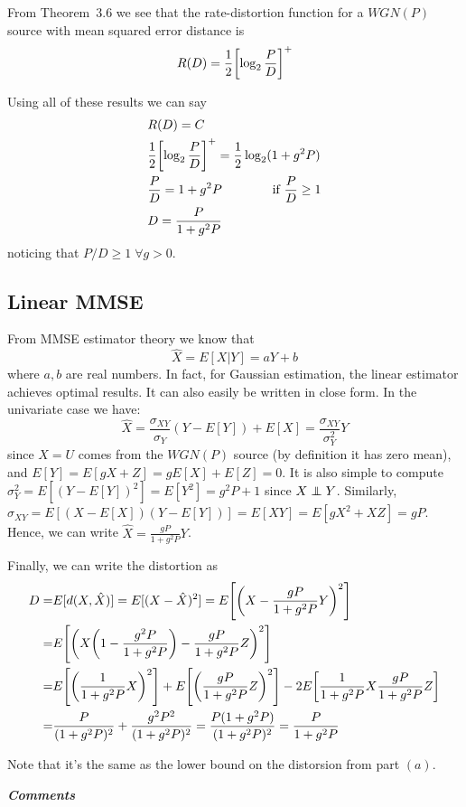 From Theorem~3.6 we see that the rate-distortion function for a $WGN(P)$ source with mean squared error distance is
%
\begin{equation}
R(D) = \frac{1}{2} \qty[\log_2 \frac{P}{D}]^+
\end{equation}

Using all of these results we can say
%
\begin{align}
\begin{split}
&R(D)=C\\
&\frac{1}{2} \qty[\log_2 \frac{P}{D}]^+ = \frac{1}{2} \log_2(1+g^2P) \\
&\frac{P}{D} = 1+g^2P \qquad\qquad \mbox{if } \frac{P}{D} \geq 1\\
&D= \frac{P}{1+g^2P}
\end{split}
\end{align}
%
noticing that $P/D \geq 1 \; \forall g>0$.

\subsection{Linear MMSE}
From MMSE estimator theory we know that
%
\begin{equation}
\hat{X} = E[X|Y] = aY+b
\end{equation}
%
where $a,b$ are real numbers. In fact, for Gaussian estimation, the linear estimator achieves optimal results. It can also easily be written in close form. In the univariate case we have:
%
\begin{equation}
\hat{X} = \frac{\sigma_{XY}}{\sigma_Y} (Y-E[Y]) + E[X] = \frac{\sigma_{XY}}{\sigma_Y^2} Y
\end{equation}
%
since $X=U$ comes from the $WGN(P)$ source (by definition it has zero mean), and $E[Y]=E[gX+Z] = gE[X]+E[Z] = 0$. It is also simple to compute $\sigma_Y^2 = E[(Y-E[Y])^2] = E[Y^2] = g^2P+1$ since $X\independent Y$. Similarly, $\sigma_{XY} = E[(X-E[X])(Y-E[Y])] = E[XY] = E[gX^2+XZ] = gP$.\\
Hence, we can write $\hat{X} = \frac{gP}{1+g^2P}Y$.

Finally, we can write the distortion as
%
\begin{align}
\begin{split}
D =& E[d(X,\hat{X})] = E[(X-\hat{X})^2] = E \qty[\qty(X-\frac{gP}{1+g^2P}Y)^2]\\
=& E \qty[\qty( X \qty(1-\frac{g^2P}{1+g^2P}) - \frac{gP}{1+g^2P}Z)^2]\\
=& E \qty[\qty( \frac{1}{1+g^2P}X)^2] + E\qty[\qty( \frac{gP}{1+g^2P}Z)^2] - 2E\qty[ \frac{1}{1+g^2P}X \frac{gP}{1+g^2P}Z ]\\
=& \frac{P}{(1+g^2P)^2} + \frac{g^2P^2}{(1+g^2P)^2} = \frac{P(1+g^2P)}{(1+g^2P)^2} = \frac{P}{1+g^2P}
\end{split}
\end{align}

Note that it's the same as the lower bound on the distorsion from part $(a)$.

\textbf{\textit{\Huge Comments}}

